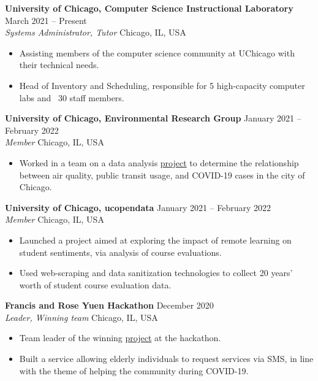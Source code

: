 \documentclass[10pt]{res} %
\begin{document}
\begin{resume}
{\bf University of Chicago, Computer Science Instructional Laboratory } \hfill March 2021 -- Present \\ 
{\sl Systems Administrator, Tutor} \hfill Chicago, IL, USA
\begin{itemize} \itemsep -2pt
    \item Assisting members of the computer science community at UChicago with their technical needs.
    \item Head of Inventory and Scheduling, responsible for 5 high-capacity computer labs and ~30 staff members.
\end{itemize}

{\bf University of Chicago, Environmental Research Group} \hfill January 2021 -- February 2022 \\
{\sl Member} \hfill Chicago, IL, USA
\begin{itemize} \itemsep -2pt
    \item Worked in a team on a data analysis \href{https://enviroresearchgroup.github.io/erg/z-covid19-air-pollution.html}{project} to determine the relationship between air quality, public transit usage, and COVID-19 cases in the city of Chicago. 
\end{itemize}

{\bf University of Chicago, ucopendata} \hfill January 2021 -- February 2022 \\
{\sl Member} \hfill Chicago, IL, USA
\begin{itemize} \itemsep -2pt
    \item Launched a project aimed at exploring the impact of remote learning on student sentiments, via analysis of course evaluations. 
    \item Used web-scraping and data sanitization technologies to collect 20 years' worth of student course evaluation data. 
\end{itemize}

{\bf Francis and Rose Yuen Hackathon} \hfill December 2020 \\
{\sl Leader, Winning team} \hfill Chicago, IL, USA
\begin{itemize} \itemsep -2pt
    \item Team leader of the winning \href{https://github.com/bhaktishh/WeBring}{project} at the hackathon. 
    \item Built a service allowing elderly individuals to request services via SMS, in line with the theme of helping the community during COVID-19.
\end{itemize}


\end{resume}
\end{document}
